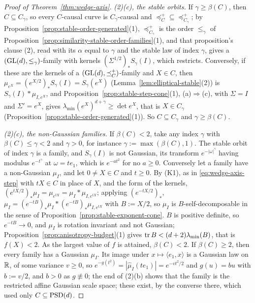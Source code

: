 \begin{proof}[Proof of Theorem~\ref{thm:wedge-axis}]
\emph{(2)(c), the stable orbits.} If $\gamma \ge \beta(C)$, then $C \subseteq C_\gamma$, so every $C$-causal
curve is $C_\gamma$-causal and $\preceq^+_C \subseteq \preceq^+_{C_\gamma}$; by Proposition~\ref{prop:stable-order-generated}(1),
$\preceq^+_{C_\gamma}$ is the order $\le_\gamma$ of Proposition~\ref{prop:similarity-stable-order-families}(1), and that
proposition's clause (2), read with its $\alpha$ equal to $\gamma$ and the stable law of index $\gamma$, gives a
$(\mathrm{GL}(d), \le_\gamma)$-family with kernels $(\Sigma^{1/2})_*S_\gamma(I)$, which restricts. Conversely, if these
are the kernels of a $(\mathrm{GL}(d), \preceq^+_C)$-family and $X \in C$, then $\mu_{e^X} = (e^{X/2})_*S_\gamma(I) =
S_\gamma(e^X)$ (Lemma~\ref{lem:elliptical-stable}(2)) is $S_\gamma(I) * \mu_{I,e^X}$, and
Proposition~\ref{prop:stable-step-cone}(1), (a)$\Rightarrow$(c), with $\Sigma = I$ and $\Sigma' = e^X$, gives
$\lambda_{\min}(e^X)^{d+\gamma} \ge \det e^X$, that is $X \in C_\gamma$ (Proposition~\ref{prop:stable-order-generated}(1)).
So $C \subseteq C_\gamma$ and $\gamma \ge \beta(C)$.

\emph{(2)(c), the non-Gaussian families.} If $\beta(C) < 2$, take any index $\gamma$ with
$\beta(C) \le \gamma < 2$ and $\gamma > 0$, for instance $\gamma := \max(\beta(C), 1)$. The
stable orbit of index $\gamma$ is a family, and $S_\gamma(I)$ is not Gaussian, its transform
$e^{-|\omega|^\gamma}$ having modulus $e^{-t^\gamma}$ at $\omega = te_1$, which is $e^{-at^2}$ for no $a \ge 0$.
Conversely let a family have a non-Gaussian $\mu_I$, and let $0 \ne X \in C$ and $t \ge 0$. By (K1), as in \ref{eq:wedge-axis-step} with
$tX \in C$ in place of $X$, and the form of the kernels, $(e^{tX/2})_*\mu_I = \mu_{e^{tX}} = \mu_I * \mu_{I,e^{tX}}$; applying
$(e^{-tX/2})_*$, $\mu_I = (e^{-tB})_*\mu_I * (e^{-tB})_*\mu_{I,e^{tX}}$ with $B := X/2$, so $\mu_I$ is
$B$-self-decomposable in the sense of Proposition~\ref{prop:stable-exponent-cone}. $B$ is positive definite, so
$e^{-tB} \to 0$, and $\mu_I$ is rotation invariant and not Gaussian; Proposition~\ref{prop:anisotropy-budget}(1) gives
$\operatorname{tr} B < (d+2)\lambda_{\min}(B)$, that is $f(X) < 2$. As the largest value of $f$ is attained, $\beta(C) < 2$.
If $\beta(C) \ge 2$, then every family has a Gaussian $\mu_I$. Its image under $x \mapsto \langle e_1, x\rangle$
is a Gaussian law on $\mathbb{R}$, of some variance $v \ge 0$, so $e^{-g(t^2)} = |\widehat\mu_I(te_1)| = e^{-vt^2/2}$ and
$g(u) = bu$ with $b := v/2$, and $b > 0$ as $g \not\equiv 0$; the end of (2)(b) shows that the
family is the restricted affine Gaussian scale space; these exist, by the converse there, which used only
$C \subseteq \mathrm{PSD}(d)$.


\end{proof}
